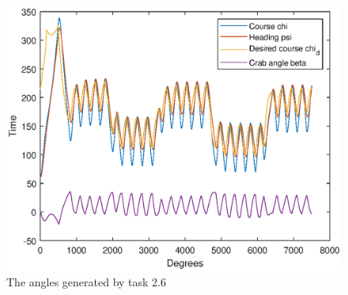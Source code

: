 \begin{figure}[ht]
	\centering
	\includegraphics[width=\textwidth]{angles2_6}
	\caption{The angles generated by task 2.6}
	\label{fig:angles2_6}
\end{figure}